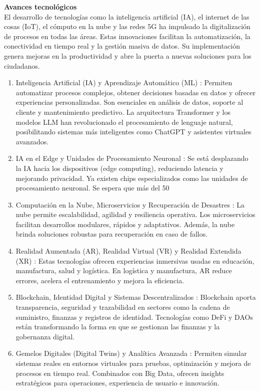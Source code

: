 \documentclass[12pt]{article}
\begin{document}
\textbf{Avances tecnológicos}\\
El desarrollo de tecnologías como la inteligencia artificial (IA), el internet de las cosas (IoT), 
el cómputo en la nube y las redes 5G ha impulsado la digitalización de procesos en todas las 
áreas. Estas innovaciones facilitan la automatización, la conectividad en tiempo real y la 
gestión masiva de datos. Su implementación genera mejoras en la productividad y abre la puerta 
a nuevas soluciones para los ciudadanos.

\begin{enumerate}
    \item Inteligencia Artificial (IA) y Aprendizaje Automático (ML) : Permiten automatizar procesos complejos, obtener decisiones basadas en datos y ofrecer experiencias personalizadas. Son esenciales en análisis de datos, soporte al cliente y mantenimiento predictivo. La arquitectura Transformer y los modelos LLM han revolucionado el procesamiento de lenguaje natural, posibilitando sistemas más inteligentes como ChatGPT y asistentes virtuales avanzados.
    \item IA en el Edge y Unidades de Procesamiento Neuronal : Se está desplazando la IA hacia los dispositivos (edge computing), reduciendo latencia y mejorando privacidad. Ya existen chips especializados como las unidades de procesamiento neuronal. Se espera que más del 50 %
    \item Computación en la Nube, Microservicios y Recuperación de Desastres : La nube permite escalabilidad, agilidad y resiliencia operativa. Los microservicios facilitan desarrollos modulares, rápidos y adaptativos. Además, la nube brinda soluciones robustas para recuperación en caso de fallos.
    \item Realidad Aumentada (AR), Realidad Virtual (VR) y Realidad Extendida (XR) : Estas tecnologías ofrecen experiencias inmersivas usadas en educación, manufactura, salud y logística. En logística y manufactura, AR reduce errores, acelera el entrenamiento y mejora la eficiencia.
    \item Blockchain, Identidad Digital y Sistemas Descentralizados : Blockchain aporta transparencia, seguridad y trazabilidad en sectores como la cadena de suministro, finanzas y registros de identidad. Tecnologías como DeFi y DAOs están transformando la forma en que se gestionan las finanzas y la gobernanza digital.
    \item Gemelos Digitales (Digital Twins) y Analítica Avanzada : Permiten simular sistemas reales en entornos virtuales para pruebas, optimización y mejora de procesos en tiempo real. Combinados con Big Data, ofrecen insights estratégicos para operaciones, experiencia de usuario e innovación.

\end{enumerate}
\end{document}
